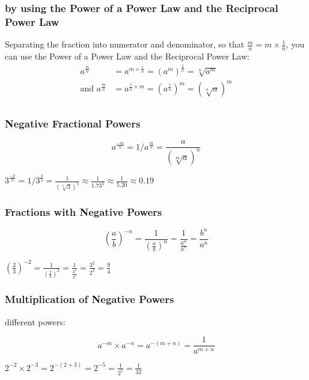 \documentclass{article}
\begin{document}
\subsubsection{by using the Power of a Power Law and the Reciprocal Power Law}
Separating the fraction into numerator and denominator, so that $\frac{m}{n}=m \times \frac{1}{n}$, you can use the Power of a Power Law and the Reciprocal Power Law:
\begin{align*}
a^{\frac{m}{n}}&=a^{m \times \frac{1}{n}}=(a^m)^{\frac{1}{n}}=\sqrt[n]{a^m}\\
\text{and }a^{\frac{m}{n}}&=a^{\frac{1}{n} \times m}=(a^{\frac{1}{n}})^m=(\sqrt[n]{a})^m\\
\end{align*}

\newpage

\subsubsection{Negative Fractional Powers}
\begin{Large}
$$a^{\frac{-m}{n}}=1/a^{\frac{m}{n}}=\frac{a}{(\sqrt[m]{a})^n}$$
\end{Large}
\begin{center}
 $3^{\frac{-2}{3}}=1/3^{\frac{2}{3}}=\frac{1}{(\sqrt[2]{3})^3}\approx \frac{1}{1.73^3}\approx\frac{1}{5.20}\approx0.19$
\end{center}

\subsubsection{Fractions with Negative Powers}
\begin{Large}
$$(\frac{a}{b})^{-n}=\frac{1}{({\frac{a}{b}})^n}=\frac{1}{\frac{a^n}{b^n}}=\frac{b^n}{a^n}$$
\end{Large}
\begin{center}
$(\frac{2}{3})^{-2}=\frac{1}{({\frac{2}{3}})^2}=\frac{1}{\frac{2^2}{3^2}}=\frac{3^2}{2^2}=\frac{9}{4}$
\end{center}

\subsubsection{Multiplication of Negative Powers}
different powers:
\begin{Large}
$$a^{-m} \times a^{-n}=a^{-(m+n)}=\frac{1}{a^{m+n}}$$
\end{Large}
\begin{center}
$2^{-2} \times 2^{-3}=2^{-(2+3)}=2^{-5}=\frac{1}{2^5}=\frac{1}{32}$
\end{center}
\end{document}
